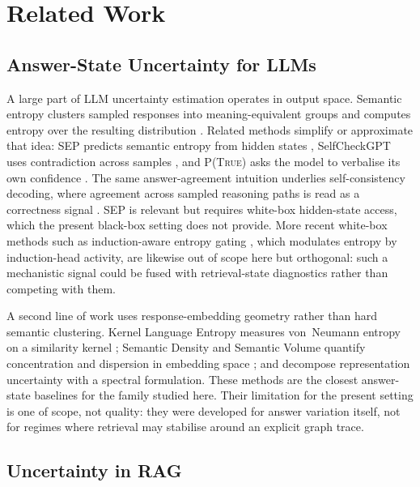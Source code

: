 \section{Related Work}
\label{sec:related_work}

\subsection{Answer-State Uncertainty for LLMs}

A large part of LLM uncertainty estimation operates in output space.
Semantic entropy clusters sampled responses into meaning-equivalent groups and
computes entropy over the resulting distribution
\citep{kuhn2023semantic,farquhar2024detecting}.
Related methods simplify or approximate that idea:
SEP predicts semantic entropy from hidden states \citep{kossen2024sep},
SelfCheckGPT uses contradiction across samples \citep{manakul2023selfcheckgpt},
and \textsc{P(True)} asks the model to verbalise its own confidence
\citep{kadavath2022language}.
The same answer-agreement intuition underlies self-consistency decoding, where
agreement across sampled reasoning paths is read as a correctness signal
\citep{wang2023selfconsistency}.
SEP is relevant but requires white-box hidden-state access, which the present
black-box setting does not provide.
More recent white-box methods such as induction-aware entropy gating
\citep{bazarova2026intrygue}, which modulates entropy by induction-head
activity, are likewise out of scope here but orthogonal: such a mechanistic
signal could be fused with retrieval-state diagnostics rather than competing
with them.

A second line of work uses response-embedding geometry rather than hard
semantic clustering.
Kernel Language Entropy measures von~Neumann entropy on a similarity kernel
\citep{nikitin2024kernellanguageentropy}; Semantic Density and Semantic
Volume quantify concentration and dispersion in embedding space
\citep{qiu2024semanticdensity,li2025semanticvolume}; and
\citet{walha2025finegrained} decompose representation uncertainty with a
spectral formulation.
These methods are the closest answer-state baselines for the family studied
here. Their limitation for the present setting is one of scope, not quality:
they were developed for answer variation itself, not for regimes where
retrieval may stabilise around an explicit graph trace.

\subsection{Uncertainty in RAG}

